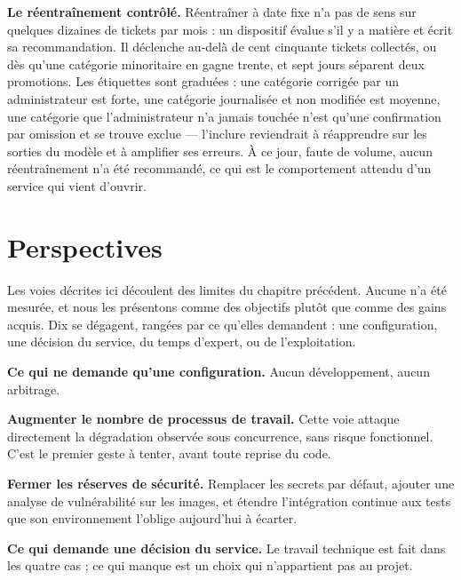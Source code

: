 \textbf{Le réentraînement contrôlé.} Réentraîner à date fixe n'a pas de sens sur quelques dizaines
de tickets par mois : un dispositif évalue s'il y a matière et écrit sa recommandation. Il déclenche
au-delà de cent cinquante tickets collectés, ou dès qu'une catégorie minoritaire en gagne trente, et
sept jours séparent deux promotions. Les étiquettes sont graduées : une catégorie corrigée par un
administrateur est forte, une catégorie journalisée et non modifiée est moyenne, une catégorie que
l'administrateur n'a jamais touchée n'est qu'une confirmation par omission et se trouve exclue —
l'inclure reviendrait à réapprendre sur les sorties du modèle et à amplifier ses erreurs. À ce jour,
faute de volume, aucun réentraînement n'a été recommandé, ce qui est le comportement attendu d'un
service qui vient d'ouvrir.

\section{Perspectives}

\label{sec:perspectives7}

Les voies décrites ici découlent des limites du chapitre précédent. Aucune n'a été mesurée, et nous
les présentons comme des objectifs plutôt que comme des gains acquis. Dix se dégagent, rangées par
ce qu'elles demandent : une configuration, une décision du service, du temps d'expert, ou de
l'exploitation.

\textbf{Ce qui ne demande qu'une configuration.} Aucun développement, aucun arbitrage.

\begin{puces}
\item \textbf{Augmenter le nombre de processus de travail.} Cette voie attaque directement la
dégradation observée sous concurrence, sans risque fonctionnel. C'est le premier geste à tenter,
avant toute reprise du code.
\item \textbf{Fermer les réserves de sécurité.} Remplacer les secrets par défaut, ajouter une
analyse de vulnérabilité sur les images, et étendre l'intégration continue aux tests que son
environnement l'oblige aujourd'hui à écarter.
\end{puces}

\textbf{Ce qui demande une décision du service.} Le travail technique est fait dans les quatre cas ;
ce qui manque est un choix qui n'appartient pas au projet.

